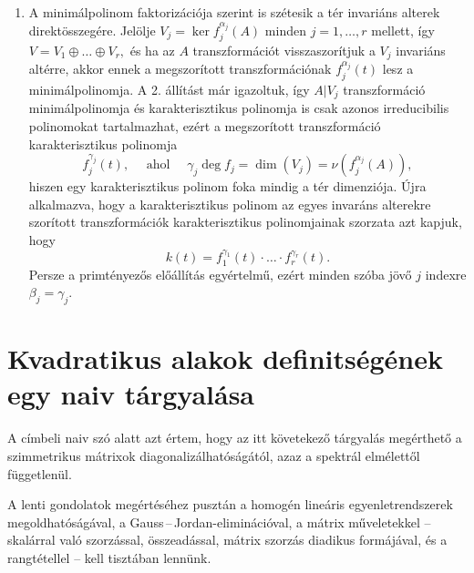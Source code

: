 \documentclass[a4paper, showtrims]{memoir}
\makeatletter
\renewenvironment{proof}[1][\proofname]
    {\par\pushQED{\qed}%
    \normalfont \topsep6\p@\@plus6\p@\relax
    \trivlist
    \item[\hskip\labelsep
        \itshape
    #1\@addpunct{:}]\ignorespaces}
    {\popQED\endtrivlist\@endpefalse}
\theoremstyle{plain}
\theoremstyle{remark}
\theoremstyle{definition}
\makeatother
\begin{document}
\begin{proof}
\begin{enumerate}
        \item
    A minimálpolinom faktorizációja szerint is szétesik a tér invariáns alterek direktösszegére.
    Jelölje 
    $
    V_j=\ker f_j^{\alpha_j}\left( A \right)
    $ minden $j=1,\ldots,r$ mellett,
    így 
    \begin{math}
        V
        =
        V_1\oplus\ldots\oplus V_r,
    \end{math}
    és ha az $A$ transzformációt visszaszorítjuk a $V_j$ invariáns altérre,
    akkor ennek a megszorított transzformációnak $f_j^{\alpha_j}\left( t \right)$ 
    lesz a minimálpolinomja.
    A 2. állítást már igazoltuk, így $A|V_j$ transzformáció minimálpolinomja
    és karakterisztikus polinomja is csak azonos irreducibilis polinomokat tartalmazhat, 
    ezért a megszorított transzformáció karakterisztikus polinomja
    \[
        f_j^{\gamma_j}\left( t \right),
        \quad\text{ ahol }\quad
        \gamma_j\deg f_j
        =
        \dim\left( V_j \right)
        =
        \nu\left( f_j^{\alpha_j}\left( A \right) \right),
    \]
    hiszen egy karakterisztikus polinom foka mindig a tér dimenziója.
    Újra alkalmazva, hogy a karakterisztikus polinom az egyes invaráns alterekre szorított transzformációk karakterisztikus polinomjainak szorzata azt kapjuk, hogy
    \[
        k\left( t \right)
        =
        f_1^{\gamma_1}\left( t \right)
        \cdot\ldots\cdot
        f_r^{\gamma_r}\left( t \right).
    \]
    Persze a primtényezős előállítás egyértelmű, ezért minden szóba jövő $j$ indexre
    $\beta_j=\gamma_j$.
    \qedhere
    \end{enumerate}
\end{proof}

\chapter{Kvadratikus alakok definitségének egy naiv tárgyalása}\label{apx:Kvadr}
A címbeli naiv szó alatt azt értem, 
hogy az itt követekező tárgyalás megérthető a szimmetrikus mátrixok diagonalizálhatóságától, azaz a spektrál elmélettől függetlenül.

A lenti gondolatok megértéséhez pusztán a homogén lineáris egyenletrendszerek megoldhatóságával, 
a Gauss\,--\,Jordan-eliminációval,
a mátrix műveletekkel -- 
skalárral való szorzással, összeadással, mátrix szorzás diadikus formájával, és a rangtétellel -- 
kell tisztában lennünk.
\end{document}
